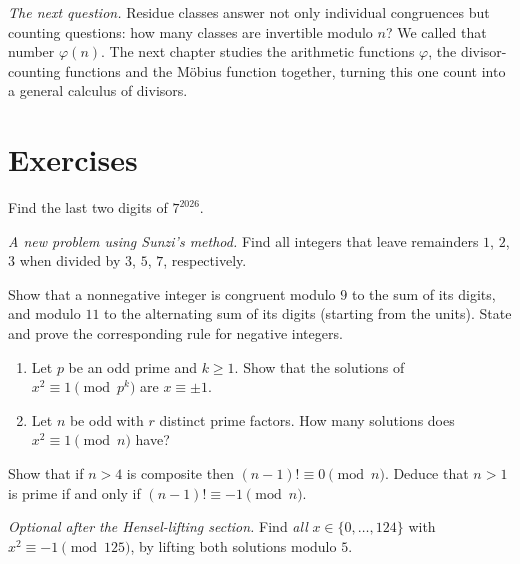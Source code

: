 \medskip
\noindent\emph{The next question.} Residue classes answer not only individual congruences but counting questions: how many classes are invertible modulo $n$? We called that number $\varphi(n)$. The next chapter studies the arithmetic functions $\varphi$, the divisor-counting functions and the M\"obius function together, turning this one count into a general calculus of divisors.

\section{Exercises}

\begin{exercise}[$\star$]\label{ex:last2}
Find the last two digits of $7^{2026}$.
\end{exercise}

\begin{exercise}[$\star$]\label{ex:sunzi}
\emph{A new problem using Sunzi's method.} Find all integers that leave remainders $1$, $2$, $3$ when divided by $3$, $5$, $7$, respectively.
\end{exercise}

\begin{exercise}[$\star$]\label{ex:digits}
Show that a nonnegative integer is congruent modulo $9$ to the sum of its digits, and modulo $11$ to the alternating sum of its digits (starting from the units). State and prove the corresponding rule for negative integers.
\end{exercise}

\begin{exercise}[$\star\star$]\label{ex:sqrt1}
\begin{enumerate}[label=(\alph*)]
\item Let $p$ be an odd prime and $k\ge1$. Show that the solutions of $x^2\equiv1\pmod{p^k}$ are $x\equiv\pm1$.
\item Let $n$ be odd with $r$ distinct prime factors. How many solutions does $x^2\equiv1\pmod n$ have?
\end{enumerate}
\end{exercise}

\begin{exercise}[$\star\star$]\label{ex:wilsonconv}
Show that if $n>4$ is composite then $(n-1)!\equiv0\pmod n$. Deduce that $n>1$ is prime if and only if $(n-1)!\equiv-1\pmod n$.
\end{exercise}

\begin{exercise}[$\star\star$]\label{ex:hensel}
\emph{Optional after the Hensel-lifting section.}
Find \emph{all} $x\in\{0,\dots,124\}$ with $x^2\equiv-1\pmod{125}$,
by lifting both solutions modulo $5$.
\end{exercise}


